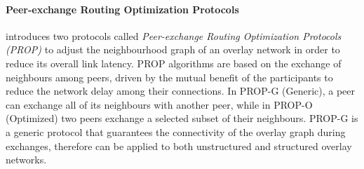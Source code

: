 \documentclass[acmcsur,acmnow]{acmtrans2m}
\begin{document}
%
%


\paragraph*{\bf Peer-exchange Routing Optimization Protocols}

\cite{qiu_prop_2007} introduces two protocols called \emph{Peer-exchange Routing
Optimization Protocols (PROP)} to adjust the neighbourhood graph of an overlay
network in order to reduce its overall link latency. PROP algorithms are based on the exchange of neighbours among peers, driven by the mutual benefit of the participants to reduce the network delay among their connections.  In PROP-G (Generic), a peer can exchange all of its neighbours with another peer, while in PROP-O (Optimized) two peers exchange a selected subset of their neighbours. PROP-G is a generic protocol that guarantees the connectivity of the overlay graph during exchanges, therefore can be applied to both unstructured and structured overlay networks. 
\end{document}
